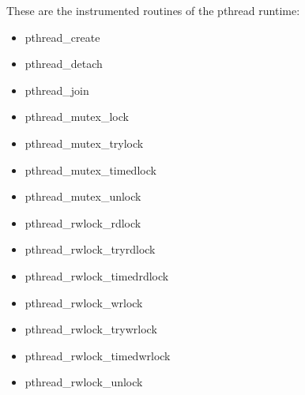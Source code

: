 These are the instrumented routines of the pthread runtime:

\begin{itemize}
\item pthread\_create
\item pthread\_detach
\item pthread\_join
\item pthread\_mutex\_lock
\item pthread\_mutex\_trylock
\item pthread\_mutex\_timedlock
\item pthread\_mutex\_unlock
\item pthread\_rwlock\_rdlock
\item pthread\_rwlock\_tryrdlock
\item pthread\_rwlock\_timedrdlock
\item pthread\_rwlock\_wrlock
\item pthread\_rwlock\_trywrlock
\item pthread\_rwlock\_timedwrlock
\item pthread\_rwlock\_unlock
\end{itemize}
